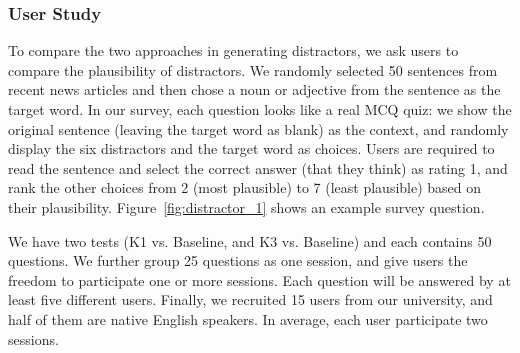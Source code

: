 

\subsubsection{User Study}
To compare the two approaches in generating distractors, we ask users to compare the plausibility of distractors.
 We randomly selected 50 sentences from recent news articles and then chose a noun or adjective from the sentence as the target word. In our survey, each question looks like a real MCQ quiz: we show the original sentence (leaving the target word as blank) as the context, and randomly display the six distractors and the target word as choices. Users are required to read the sentence and select the correct answer (that they think) as rating 1, and rank the other choices from 2 (most plausible) to 7 (least plausible) based on their plausibility. Figure~\ref{fig:distractor_1} shows an example survey question.
 

We have two tests (K1  vs. Baseline, and K3  vs. Baseline) and each contains 50 questions. We further group 25 questions as one session, and give users the freedom to participate one or more sessions. Each question will be answered by at least five different users.
Finally, we recruited 15 users from our university, and half of them are native English speakers. 
In average, each user participate two sessions.






